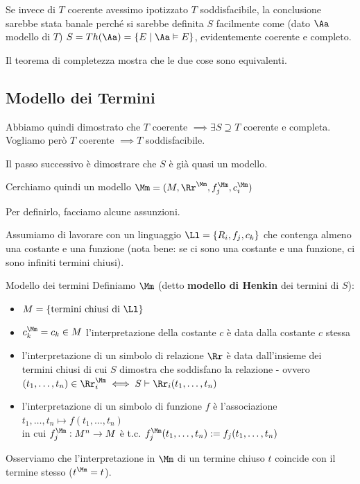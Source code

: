 \documentclass[a4paper,11pt]{report}
\begin{document}
Se invece di \( T \) coerente avessimo ipotizzato \( T \) soddisfacibile, la conclusione sarebbe stata banale perché si sarebbe definita \( S \) facilmente come (dato \( \Aa \) modello di \( T \)) \( S = Th(\Aa) = \{E \mid \Aa \vDash E\}\), evidentemente coerente e completo.

Il teorema di completezza mostra che le due cose sono equivalenti.

\subsection{Modello dei Termini}

Abbiamo quindi dimostrato che \( T \) coerente \( \implies \exists S \supseteq T\) coerente e completa. \\Vogliamo però \( T \) coerente \( \implies T \) soddisfacibile.

Il passo successivo è dimostrare che \( S \) è già quasi un modello.

Cerchiamo quindi un modello \( \Mm = (M, \Rr^\Mm, f_j^\Mm, c_i^\Mm) \)

Per definirlo, facciamo alcune assunzioni.

Assumiamo di lavorare con un linguaggio \( \Ll = \{R_i, f_j, c_k\} \) che contenga almeno una costante e una funzione (nota bene: se ci sono una costante e una funzione, ci sono infiniti termini chiusi).

\begin{defframe}{Modello dei termini}{}
Definiamo \( \Mm \) (detto \textbf{modello di Henkin} dei termini di \( S \)):
\begin{itemize}
    \item \( M = \{\text{termini chiusi di } \Ll \}\)
    \item \( c_k^\Mm = c_k \in M \) 
        \subitem l'interpretazione della costante \( c \) è data dalla costante \( c \) stessa
    \item l'interpretazione di un simbolo di relazione \( \Rr \) è data dall'insieme dei termini chiusi di cui \( S \) dimostra che soddisfano la relazione - ovvero \( (t_1, \dots, t_n) \in \Rr^\Mm_i \iff  S \vdash \Rr_i(t_1, \dots, t_n)\)
    \item l'interpretazione di un simbolo di funzione \( f \) è l'associazione \( t_1, \dots, t_n \mapsto f(t_1, \dots, t_n) \)\\ in cui \( f^\Mm_j : M^n \to M \) è t.c. \( f^\Mm_j (t_1, \dots, t_n) := f_j(t_1, \dots, t_n) \)

\end{itemize}

Osserviamo che l'interpretazione in \( \Mm \) di un termine chiuso \( t \) coincide con il termine stesso (\( t^\Mm = t \)).

\end{defframe}
\end{document}
